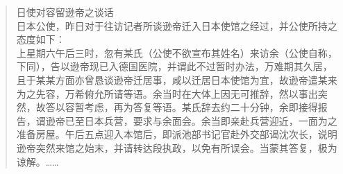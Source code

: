 \begin{quote}
	日使对容留逊帝之谈话\\

日本公使，昨日对于往访记者所谈逊帝迁入日本使馆之经过，并公使所持之态度如下：\\

上星期六午后三时，忽有某氏（公使不欲宣布其姓名）来访余（公使自称，下同），告以逊帝现已入德国医院，并谓此不过暂时办法，万难期其久居，且于某某方面亦曾恳谈逊帝迁居事，咸以迁居日本使馆为宜，故逊帝遣某来为之先容，万希俯允所请等语。余当时在大体上因无可推辞，然以事出突然，故答以容暂考虑，再为答复等语。某氏辞去约二十分钟，余即接得报告，谓逊帝已至日本兵营，要求与余面会。余当即亲赴兵营迎近，一面为之准备房屋。午后五点迎入本馆后，即派池部书记官赴外交部谒沈次长，说明逊帝突然来馆之始末，并请转达段执政，以免有所误会。当蒙其答复，极为谅解。……\\
\end{quote}